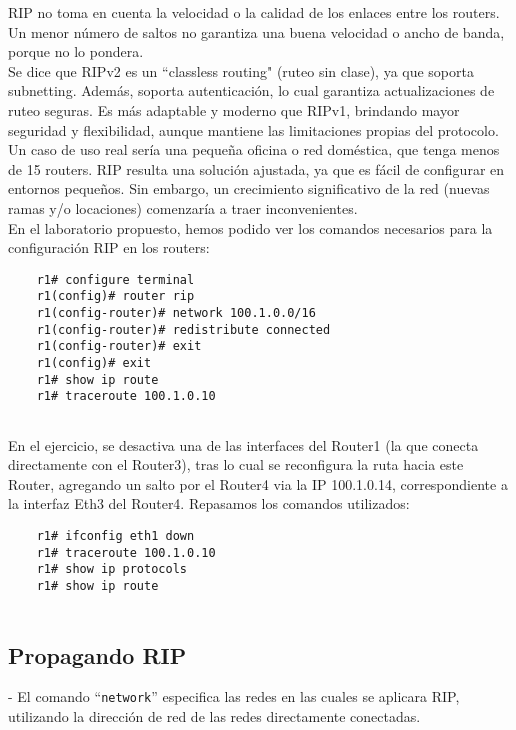 \documentclass{article}
\begin{document}
RIP no toma en cuenta la velocidad o la calidad de los enlaces entre los routers. Un menor n\'umero de saltos no garantiza una buena velocidad o ancho de banda, porque no lo pondera. \\

Se dice que RIPv2 es un ``classless routing" (ruteo sin clase), ya que soporta subnetting. Adem\'as, soporta autenticaci\'on, lo cual garantiza actualizaciones de ruteo seguras. Es m\'as adaptable y moderno que RIPv1, brindando mayor seguridad y flexibilidad, aunque mantiene las limitaciones propias del protocolo. \\

Un caso de uso real ser\'ia una pequeña oficina o red dom\'estica, que tenga menos de 15 routers. RIP resulta una soluci\'on ajustada, ya que es f\'acil de configurar en entornos pequeños. Sin embargo, un crecimiento significativo de la red (nuevas ramas y/o locaciones) comenzar\'ia a traer inconvenientes. \\

En el laboratorio propuesto, hemos podido ver los comandos necesarios para la configuraci\'on RIP en los routers:

\begin{verbatim}
    r1# configure terminal
    r1(config)# router rip
    r1(config-router)# network 100.1.0.0/16
    r1(config-router)# redistribute connected
    r1(config-router)# exit
    r1(config)# exit
    r1# show ip route
    r1# traceroute 100.1.0.10
    
\end{verbatim}

En el ejercicio, se desactiva una de las interfaces del Router1 (la que conecta directamente con el Router3), tras lo cual se reconfigura la ruta hacia este Router, agregando un salto por el Router4 via la IP 100.1.0.14, correspondiente a la interfaz Eth3 del Router4. Repasamos los comandos utilizados:

\begin{verbatim}
    r1# ifconfig eth1 down
    r1# traceroute 100.1.0.10
    r1# show ip protocols
    r1# show ip route
    
\end{verbatim}

\subsection{Propagando RIP}

- El comando ``\texttt{network}'' especifica las redes en las cuales se aplicara RIP, utilizando la direcci\'on de red de las redes directamente conectadas. \\
\end{document}

